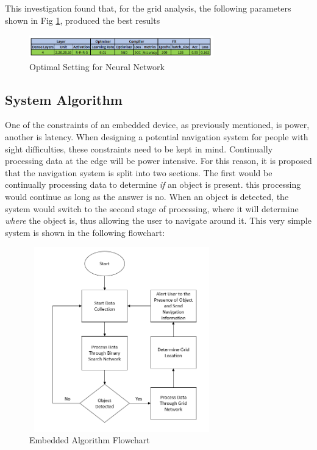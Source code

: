 \documentclass[conference]{IEEEtran}
\begin{document}
This investigation found that, for the grid analysis, the following parameters shown in Fig \ref{fig:nn_settings}, produced the best results

\begin{figure}[ht]
\includegraphics[width=8cm, height=1cm]{images/nn_settings.png}
\centering
\caption{Optimal Setting for Neural Network}
\label{fig:nn_settings}
\end{figure}



\subsection{System Algorithm}
One of the constraints of an embedded device, as previously mentioned, is power, another is latency. When designing a potential navigation system for people with sight difficulties, these constraints need to be kept in mind. Continually processing data at the edge will be power intensive. For this reason, it is proposed that the navigation system is split into two sections. The first would be continually processing data to determine \textit{if} an object is present. this processing would continue as long as the answer is no. When an object is detected, the system would switch to the second stage of processing, where it will determine \textit{where} the object is, thus allowing the user to navigate around it. This very simple system is shown in the following flowchart:

\begin{figure}[ht]
\includegraphics[width=8cm, height=8cm]{images/embedded_algo_flowchart.png}
\centering
\caption{Embedded Algorithm Flowchart}
\label{fig:embedded_algo_flowchart}
\end{figure}
\end{document}
